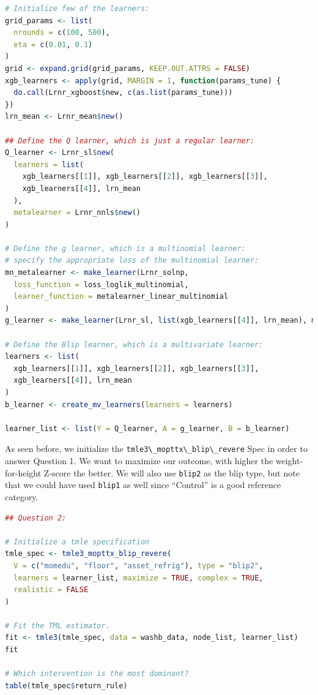 \documentclass[
  12pt, krantz2,
]{book}
\newcommand{\passthrough}[1]{#1}
\theoremstyle{definition}
\theoremstyle{definition}
\theoremstyle{definition}
\newcommand{\1}{\mathbbm{1}}
\begin{document}
\begin{lstlisting}[language=R]
# Initialize few of the learners:
grid_params <- list(
  nrounds = c(100, 500),
  eta = c(0.01, 0.1)
)
grid <- expand.grid(grid_params, KEEP.OUT.ATTRS = FALSE)
xgb_learners <- apply(grid, MARGIN = 1, function(params_tune) {
  do.call(Lrnr_xgboost$new, c(as.list(params_tune)))
})
lrn_mean <- Lrnr_mean$new()

## Define the Q learner, which is just a regular learner:
Q_learner <- Lrnr_sl$new(
  learners = list(
    xgb_learners[[1]], xgb_learners[[2]], xgb_learners[[3]],
    xgb_learners[[4]], lrn_mean
  ),
  metalearner = Lrnr_nnls$new()
)

# Define the g learner, which is a multinomial learner:
# specify the appropriate loss of the multinomial learner:
mn_metalearner <- make_learner(Lrnr_solnp,
  loss_function = loss_loglik_multinomial,
  learner_function = metalearner_linear_multinomial
)
g_learner <- make_learner(Lrnr_sl, list(xgb_learners[[4]], lrn_mean), mn_metalearner)

# Define the Blip learner, which is a multivariate learner:
learners <- list(
  xgb_learners[[1]], xgb_learners[[2]], xgb_learners[[3]],
  xgb_learners[[4]], lrn_mean
)
b_learner <- create_mv_learners(learners = learners)

learner_list <- list(Y = Q_learner, A = g_learner, B = b_learner)
\end{lstlisting}

As seen before, we initialize the \passthrough{\lstinline!tmle3\_mopttx\_blip\_revere!} Spec in order to
answer Question 1. We want to maximize our outcome, with higher the weight-for-height Z-score
the better. We will also use \passthrough{\lstinline!blip2!} as the blip type, but note that we could have used \passthrough{\lstinline!blip1!}
as well since ``Control'' is a good reference category.

\begin{lstlisting}[language=R]
## Question 2:

# Initialize a tmle specification
tmle_spec <- tmle3_mopttx_blip_revere(
  V = c("momedu", "floor", "asset_refrig"), type = "blip2",
  learners = learner_list, maximize = TRUE, complex = TRUE,
  realistic = FALSE
)

# Fit the TML estimator.
fit <- tmle3(tmle_spec, data = washb_data, node_list, learner_list)
fit

# Which intervention is the most dominant?
table(tmle_spec$return_rule)
\end{lstlisting}
\end{document}
